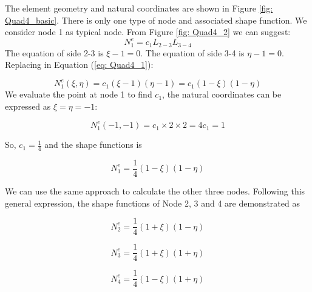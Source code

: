 The element geometry and natural coordinates are shown in Figure \ref{fig: Quad4_basic}. There is only one type of node and associated shape function. We consider node 1 as typical node. From Figure \ref{fig: Quad4_2} we can suggest:
\begin{equation} \label{eq: Quad4_1}
N_1^e = c_1L_{2-3}L_{3-4}
\end{equation}
The equation of side 2-3 is $\xi - 1 = 0$. The equation of side 3-4 is $\eta - 1 = 0$. Replacing in Equation (\ref{eq: Quad4_1}):

\begin{equation}
N_1^e\left(\xi, \eta\right) = c_1 \left( \xi -1 \right) \left( \eta - 1\right) = c_1 \left(1 - \xi\right) \left( 1 - \eta \right)
\end{equation}
We evaluate the point at node 1 to find $c_1$, the natural coordinates can be expressed as $\xi = \eta = -1$:

\begin{equation}
N_1^e \left(-1, -1 \right) = c_1 \times 2 \times 2 = 4c_1 = 1
\end{equation}

So, $c_1 = \frac{1}{4}$ and the shape functions is

\begin{equation}
N_1^e = \frac{1}{4} \left(1 - \xi\right) \left( 1 - \eta\right)
\end{equation}

We can use the same approach to calculate the other three nodes. Following this general expression, the shape functions of Node 2, 3 and 4 are demonstrated as

\begin{equation}
N_2^e = \frac{1}{4} \left(1 + \xi\right) \left( 1 - \eta\right)
\end{equation}

\begin{equation}
N_3^e = \frac{1}{4} \left(1 + \xi\right) \left( 1 + \eta\right)
\end{equation}

\begin{equation}
N_4^e = \frac{1}{4} \left(1 - \xi\right) \left( 1 + \eta\right)
\end{equation}

